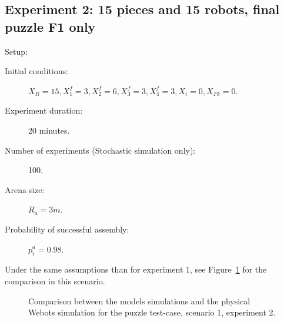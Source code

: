 	
	\subsection{Experiment 2: 15 pieces and 15 robots, final puzzle F1 only} %
	\label{sub:experiment_2_15_pieces_and_15_robots_final_puzzle_f1_only} 
		Setup:
		\begin{description}
			\item[Initial conditions:] $X_R = 15, X_1^f=3, X_2^f=6, X_3^f=3, X_4^f=3, X_i=0, X_{Fk}=0$.
			\item[Experiment duration:] 20 minutes.
			\item[Number of experiments (Stochastic simulation only):] 100.
			\item[Arena size:] $R_a = 3m$.
			\item[Probability of successful assembly:] $p^a_i = 0.98$.
		\end{description}
			
		Under the same assumptions than for experiment 1, see Figure~\ref{fig:models_comparison_experiment2} for the comparison in this scenario.			
			
		\begin{figure}[h!]
			\: %
			\caption{Comparison between the models simulations and the physical Webots simulation for the puzzle test-case, scenario 1, experiment 2.}
		\label{fig:models_comparison_experiment2} %
		\end{figure}
			
